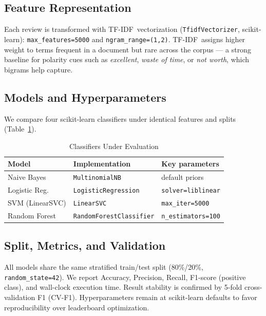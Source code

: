 \documentclass[conference]{IEEEtran}
\newcommand{\TFIDF}{TF-IDF}
\begin{document}
\subsection{Feature Representation}

\begin{sloppypar}
Each review is transformed with \TFIDF\ vectorization
(\texttt{TfidfVectorizer}, scikit-learn):
\texttt{max\_features=5000} and \texttt{ngram\_range=(1,2)}.
\TFIDF\ assigns higher weight to terms frequent in a document but
rare across the corpus --- a strong baseline for polarity cues
such as \textit{excellent}, \textit{waste of time}, or
\textit{not worth}, which bigrams help capture.
\end{sloppypar}

\subsection{Models and Hyperparameters}

We compare four scikit-learn classifiers under identical features
and splits (Table~\ref{tab:models}).

\begin{table}[!t]
  \caption{Classifiers Under Evaluation}
  \label{tab:models}
  \centering
  \footnotesize
  \begin{tabular}{lll}
    \toprule
    \textbf{Model} & \textbf{Implementation} & \textbf{Key parameters} \\
    \midrule
    Naive Bayes        & \texttt{MultinomialNB}          & default priors \\
    Logistic Reg.      & \texttt{LogisticRegression}     & \texttt{solver=liblinear} \\
    SVM (LinearSVC)    & \texttt{LinearSVC}              & \texttt{max\_iter=5000} \\
    Random Forest      & \texttt{RandomForestClassifier} & \texttt{n\_estimators=100} \\
    \bottomrule
  \end{tabular}
\end{table}

\subsection{Split, Metrics, and Validation}

All models share the same stratified train/test split
(80\%/20\%, \texttt{random\_state=42}).
We report Accuracy, Precision, Recall, F1-score (positive class),
and wall-clock execution time.
Result stability is confirmed by 5-fold cross-validation F1
(\mbox{CV-F1}).
Hyperparameters remain at scikit-learn defaults to favor
reproducibility over leaderboard optimization.
\end{document}
